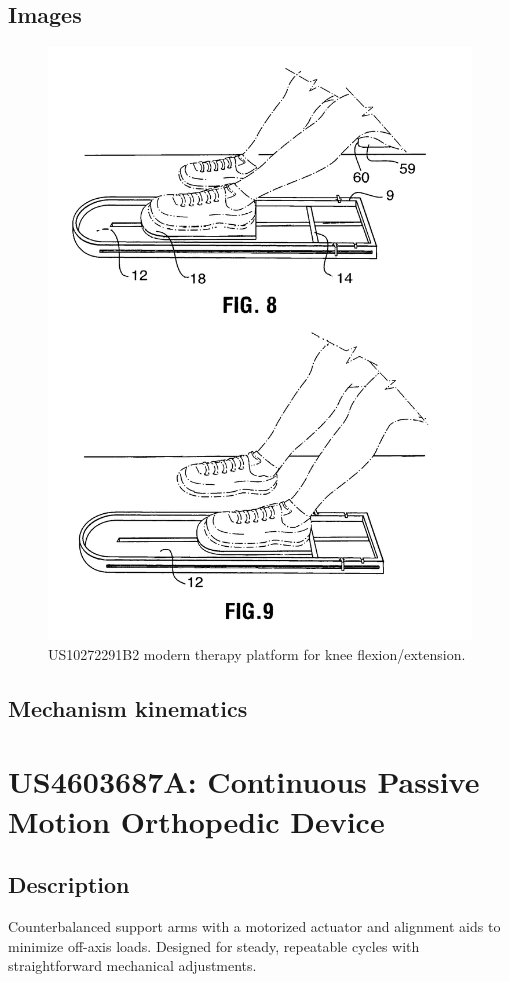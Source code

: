 \documentclass[11pt]{article}
\begin{document}
\subsection{Images}
\begin{figure}[H]
  \centering
  \includegraphics[width=0.54\linewidth]{10272291B2_1.png}
  \caption{US10272291B2 modern therapy platform for knee flexion/extension.}
  \label{fig:US10272291B2}
\end{figure}

\subsection{Mechanism kinematics}

\section{US4603687A: Continuous Passive Motion Orthopedic Device}
\subsection{Description}
Counterbalanced support arms with a motorized actuator and alignment aids to minimize off-axis loads. Designed for steady, repeatable cycles with straightforward mechanical adjustments.
\end{document}
